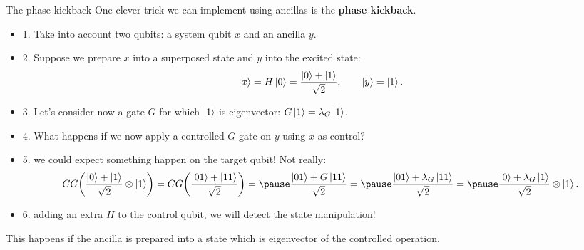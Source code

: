 \documentclass[aspectratio=169, 8pt, xcolor={svgnames}, hyperref={linkcolor=black}]{beamer}
\begin{document}
\begin{frame}{The phase kickback}
One clever trick we can implement using ancillas is the \textbf{phase kickback}.
\pause

\begin{itemize}[noitemsep]
\item{1.} Take into account two qubits: a system qubit $x$ and an ancilla $y$.  \pause
\item{2.} Suppose we prepare $x$ into a superposed state and $y$ into the excited state:
$$ \ket{x}=H\ket{0} = \frac{\ket{0}+\ket{1}}{\sqrt{2}}, \qquad \ket{y}=\ket{1}. $$ \pause
\item{3.} Let's consider now a gate $G$ for which $\ket{1}$ is eigenvector: $G\ket{1}=\lambda_G \ket{1}$.
\item{4.} What happens if we now apply a controlled-$G$ gate on $y$ using $x$ as control? \pause
\item{5.} we could expect something happen on the target qubit! Not really: \pause
$$ CG \biggl( \frac{\ket{0}+\ket{1}}{\sqrt{2}} \otimes \ket{1} \biggr)  = 
CG \biggl( \frac{\ket{01}+\ket{11}}{\sqrt{2}} \biggr) = \pause
\frac{\ket{01}+G\ket{11}}{\sqrt{2}} = \pause
\frac{\ket{01}+\lambda_G \ket{11}}{\sqrt{2}} = \pause
\frac{\ket{0}+\lambda_G \ket{1}}{\sqrt{2}} \otimes \ket{1}.
$$ \pause
\item{6.} adding an extra $H$ to the control qubit, we will detect the state manipulation!
\end{itemize}

\pause
\begin{tcolorbox}[colback=red!15, title=Important]
This happens if the ancilla is prepared into a state which is eigenvector of the 
controlled operation.
\end{tcolorbox}

\end{frame}
\end{document}
